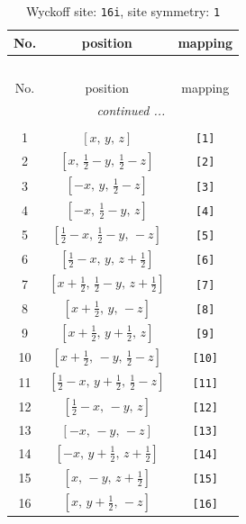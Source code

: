 \documentclass[fleqn,8pt]{jsarticle}
\begin{document}
\begin{longtable}{ccc}
\caption{Wyckoff site: {\tt 16i}, site symmetry: {\tt 1}}
 \\
 \hline \hline
No. & position & mapping \\ \hline \endfirsthead

\multicolumn{2}{l}{\tablename\ \thetable{}} \\
 \hline \hline
No. & position & mapping \\ \hline \endhead

 \hline \hline
\multicolumn{2}{r}{\footnotesize\it continued ...} \\ \endfoot

 \hline \hline
\multicolumn{2}{r}{} \\ \endlastfoot

1 & $\left[ x,\, y,\, z \right]$ & {\tt [1]} \\ \hline
2 & $\left[ x,\, \frac{1}{2} - y,\, \frac{1}{2} - z \right]$ & {\tt [2]} \\ \hline
3 & $\left[ - x,\, y,\, \frac{1}{2} - z \right]$ & {\tt [3]} \\ \hline
4 & $\left[ - x,\, \frac{1}{2} - y,\, z \right]$ & {\tt [4]} \\ \hline
5 & $\left[ \frac{1}{2} - x,\, \frac{1}{2} - y,\, - z \right]$ & {\tt [5]} \\ \hline
6 & $\left[ \frac{1}{2} - x,\, y,\, z + \frac{1}{2} \right]$ & {\tt [6]} \\ \hline
7 & $\left[ x + \frac{1}{2},\, \frac{1}{2} - y,\, z + \frac{1}{2} \right]$ & {\tt [7]} \\ \hline
8 & $\left[ x + \frac{1}{2},\, y,\, - z \right]$ & {\tt [8]} \\ \hline
9 & $\left[ x + \frac{1}{2},\, y + \frac{1}{2},\, z \right]$ & {\tt [9]} \\ \hline
10 & $\left[ x + \frac{1}{2},\, - y,\, \frac{1}{2} - z \right]$ & {\tt [10]} \\ \hline
11 & $\left[ \frac{1}{2} - x,\, y + \frac{1}{2},\, \frac{1}{2} - z \right]$ & {\tt [11]} \\ \hline
12 & $\left[ \frac{1}{2} - x,\, - y,\, z \right]$ & {\tt [12]} \\ \hline
13 & $\left[ - x,\, - y,\, - z \right]$ & {\tt [13]} \\ \hline
14 & $\left[ - x,\, y + \frac{1}{2},\, z + \frac{1}{2} \right]$ & {\tt [14]} \\ \hline
15 & $\left[ x,\, - y,\, z + \frac{1}{2} \right]$ & {\tt [15]} \\ \hline
16 & $\left[ x,\, y + \frac{1}{2},\, - z \right]$ & {\tt [16]} \\
\end{longtable}
\end{document}

